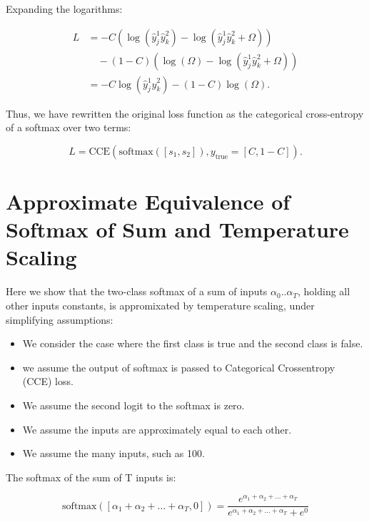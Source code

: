 \documentclass[twoside,11pt]{article}
\begin{document}
Expanding the logarithms:

\begin{align}
  \nonumber
  L &= - C \left( \log (\hat{y}_j^1 \hat{y}_k^2) - \log (\hat{y}_j^1 \hat{y}_k^2 + \Omega) \right) \\
    \nonumber
    &\quad - (1 - C) \left( \log (\Omega) - \log (\hat{y}_j^1 \hat{y}_k^2 + \Omega) \right) \\
    \nonumber
    &= - C \log (\hat{y}_j^1 \hat{y}_k^2) - (1 - C) \log (\Omega) .
  \end{align}


Thus, we have rewritten the original loss function as the categorical cross-entropy of a softmax over two terms:

\[
L = \text{CCE}(\text{softmax}([s_1, s_2]), y_{\text{true}}=[C, 1 - C]).
\]


\section{Approximate Equivalence of Softmax of Sum and Temperature Scaling}

\label{app:softmax-sum-temp}

Here we show that the two-class softmax of a sum of inputs $\alpha_0..\alpha_T$, 
holding 
all other inputs constants, is appromixated by 
temperature scaling, under simplifying assumptions:

\begin{itemize}
  \item We consider the case where the first class is true and the second class is false. 
  \item we assume the output of softmax is passed to Categorical Crossentropy (CCE) loss. 
  \item We assume the second logit to the softmax is zero.
  \item We assume the inputs are approximately equal to each other. 
  \item We assume the many inputs, such as 100. 
\end{itemize}

The softmax of the sum of T inputs is:

\[
  \text{softmax}(
                 [\alpha_1 + \alpha_2 + \ldots + \alpha_T, 0])
  = 
  \frac{e^{\alpha_1 + \alpha_2 + \ldots + \alpha_T}}{e^{\alpha_1 + \alpha_2 + \ldots + \alpha_T} + e^0}
\]
\end{document}
